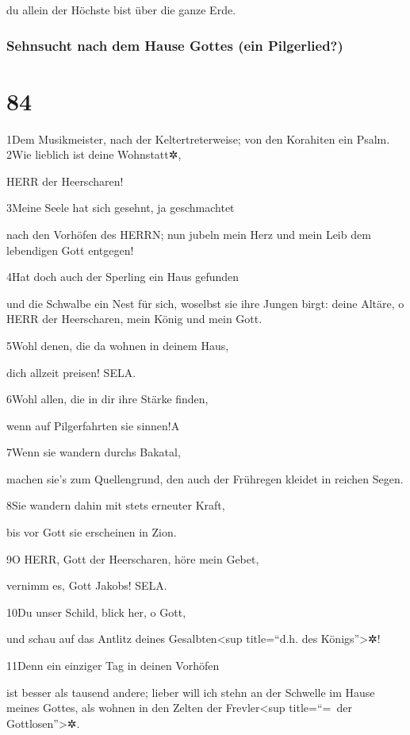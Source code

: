 du allein der Höchste bist über die ganze Erde.

\hypertarget{sehnsucht-nach-dem-hause-gottes-ein-pilgerlied}{%
\subsubsection{Sehnsucht nach dem Hause Gottes (ein
Pilgerlied?)}\label{sehnsucht-nach-dem-hause-gottes-ein-pilgerlied}}

\hypertarget{section-83}{%
\section{84}\label{section-83}}

1Dem Musikmeister, nach der Keltertreterweise; von den Korahiten ein
Psalm. 2Wie lieblich ist deine Wohnstatt✲,

HERR der Heerscharen!

3Meine Seele hat sich gesehnt, ja geschmachtet

nach den Vorhöfen des HERRN; nun jubeln mein Herz und mein Leib dem
lebendigen Gott entgegen!

4Hat doch auch der Sperling ein Haus gefunden

und die Schwalbe ein Nest für sich, woselbst sie ihre Jungen birgt:
deine Altäre, o HERR der Heerscharen, mein König und mein Gott.

5Wohl denen, die da wohnen in deinem Haus,

dich allzeit preisen! SELA.

6Wohl allen, die in dir ihre Stärke finden,

wenn auf Pilgerfahrten sie sinnen!{A}

7Wenn sie wandern durchs Bakatal,

machen sie's zum Quellengrund, den auch der Frühregen kleidet in reichen
Segen.

8Sie wandern dahin mit stets erneuter Kraft,

bis vor Gott sie erscheinen in Zion.

9O HERR, Gott der Heerscharen, höre mein Gebet,

vernimm es, Gott Jakobs! SELA.

10Du unser Schild, blick her, o Gott,

und schau auf das Antlitz deines Gesalbten\textless sup title=``d.h. des
Königs''\textgreater✲!

11Denn ein einziger Tag in deinen Vorhöfen

ist besser als tausend andere; lieber will ich stehn an der Schwelle im
Hause meines Gottes, als wohnen in den Zelten der Frevler\textless sup
title=``=~der Gottlosen''\textgreater✲.

